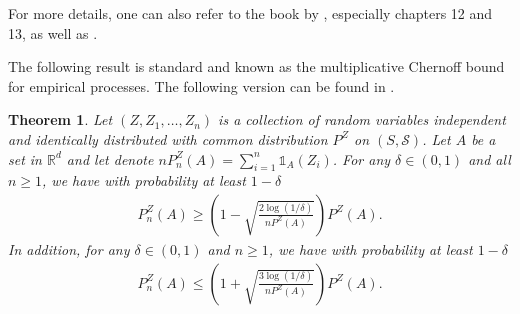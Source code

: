 \documentclass[paper=a4, fontsize=11pt]{scrartcl}
\newcommand{\ind}{\mathds{1}}
\newcommand{\PP}{\mathbb{P}}
\newtheorem{theorem}{Theorem}
\begin{document}
For more details, one can also refer to the book by \cite{boucheron2013concentration}, especially chapters 12 and 13, as well as \cite{devroye96probabilistic}. 



The following result is standard and known as the multiplicative Chernoff bound for empirical processes. The following version can be found in \cite{hagerup1990guided}.


\begin{theorem}\label{lemma=chernoff}
Let $(Z, Z_1, \ldots , Z_n) $ is a collection of random variables independent and identically distributed with common distribution $P^Z$ on $(S,\mathcal S)$. Let $A$ be a set in $\mathbb R^d$ and let denote $nP_n^Z(A) = \sum_{i=1}^n \ind_{A}(Z_i)$. For any $\delta \in (0,1)$ and all $n\geq 1$, we have with probability at least $1-\delta$
\begin{align*}
P_n^Z(A) \geq \left(1- \sqrt{ \frac{2 \log(1/\delta)  }{ nP^Z(A) } } \right) P^Z(A)  .
\end{align*}
 In addition, for any $\delta \in (0,1)$ and $n\geq 1$, we have with probability at least $1-\delta$
\begin{align*}
P_n^Z(A)  \leq \left(1 +  \sqrt{ \frac{3 \log(1/\delta)   }{ n P^Z(A)} }  \right) P^Z(A).
\end{align*}
\end{theorem}
\end{document}
